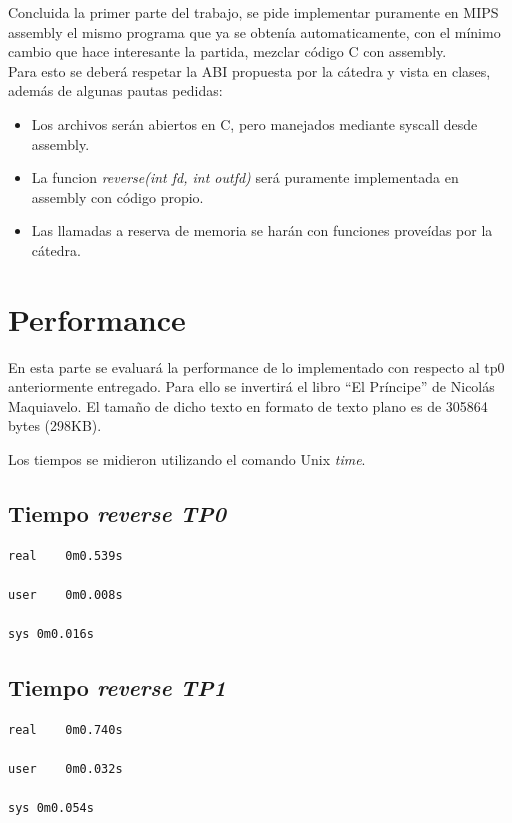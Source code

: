 \documentclass{article}
\begin{document}
Concluida la primer parte del trabajo, se pide implementar puramente en MIPS assembly el mismo programa que ya se obten\'ia automaticamente, con el m\'inimo cambio que hace interesante la partida, mezclar c\'odigo C con assembly.\\
Para esto se deber\'a respetar la ABI propuesta por la c\'atedra y vista en clases, adem\'as de algunas pautas pedidas:
\begin{itemize}
	\item Los archivos ser\'an abiertos en C, pero manejados mediante syscall desde assembly.
	\item La funcion \textit{reverse(int fd, int outfd)} ser\'a puramente implementada en assembly con c\'odigo propio.
	\item Las llamadas a reserva de memoria se har\'an con funciones prove\'idas por la c\'atedra.
\end{itemize}

\section{Performance}

En esta parte se evaluar\'a la performance de lo implementado con respecto al tp0 anteriormente entregado. Para ello se invertir\'a el libro ``El Príncipe'' de Nicolás Maquiavelo.
El tamaño de dicho texto en formato de texto plano es de 305864 bytes (298KB).

Los tiempos se midieron utilizando el comando Unix \emph{time}.

\subsection{Tiempo \emph{reverse TP0}}

\begin{verbatim}
real	0m0.539s

user	0m0.008s

sys	0m0.016s
\end{verbatim}



\subsection{Tiempo \emph{reverse TP1}}

\begin{verbatim}
real	0m0.740s

user	0m0.032s

sys	0m0.054s
\end{verbatim}
\end{document}
